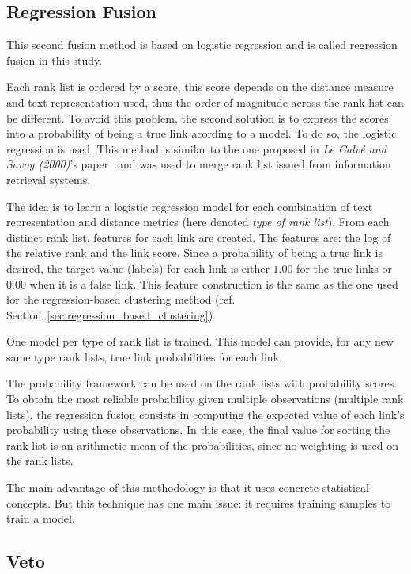 \subsection{Regression Fusion \label{sec:regression_fusion}}

This second fusion method is based on logistic regression and is called regression fusion in this study.

Each rank list is ordered by a score, this score depends on the distance measure and text representation used, thus the order of magnitude across the rank list can be different.
To avoid this problem, the second solution is to express the scores into a probability of being a true link acording to a model.
To do so, the logistic regression is used.
This method is similar to the one proposed in \textit{Le Calvé and Savoy (2000)}'s paper~\cite{le_calve_database_merging} and was used to merge rank list issued from information retrieval systems.

The idea is to learn a logistic regression model for each combination of text representation and distance metrics (here denoted \textit{type of rank list}).
From each distinct rank list, features for each link are created.
The features are: the log of the relative rank and the link score.
Since a probability of being a true link is desired, the target value (labels) for each link is either $1.00$ for the true links or $0.00$ when it is a false link.
This feature construction is the same as the one used for the regression-based clustering method (ref. Section~\ref{sec:regression_based_clustering}).

One model per type of rank list is trained.
This model can provide, for any new same type rank lists, true link probabilities for each link.

The probability framework can be used on the rank lists with probability scores.
To obtain the most reliable probability given multiple observations (multiple rank lists), the regression fusion consists in computing the expected value of each link's probability using these observations.
In this case, the final value for sorting the rank list is an arithmetic mean of the probabilities, since no weighting is used on the rank lists.

The main advantage of this methodology is that it uses concrete statistical concepts.
But this technique has one main issue: it requires training samples to train a model.

\subsection{Veto}

